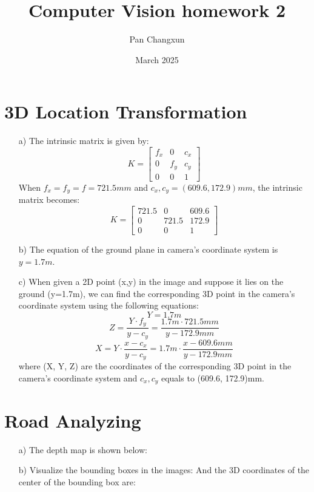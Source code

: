 \documentclass[]{article}
\title{Computer Vision homework 2}
\author{Pan Changxun}
\date{March 2025}
\begin{document}
\maketitle

\section{3D Location Transformation}
\begin{enumerate}
	\item[a)] The intrinsic matrix is given by:
	\begin{equation}
		K = \begin{bmatrix}
			f_x & 0 & c_x \\
			0 & f_y & c_y \\
			0 & 0 & 1
		\end{bmatrix}
	\end{equation}
	When \(f_x = f_y = f = 721.5mm\) and \(c_x, c_y = (609.6, 172.9)mm\), the intrinsic matrix becomes:
	\begin{equation}
		K = \begin{bmatrix}
			721.5 & 0 & 609.6 \\
			0 & 721.5 & 172.9 \\
			0 & 0 & 1
		\end{bmatrix}
	\end{equation}
	\item[b)] The equation of the ground plane in camera's coordinate system is \(y=1.7m\).
	\item[c)] When given a 2D point (x,y) in the image and suppose it lies on the ground (y=1.7m), we can find the corresponding 3D point in the camera's coordinate system using the following equations:
	\begin{equation}
		Y = 1.7m
	\end{equation}
	\begin{equation}
		Z = \frac{Y \cdot f_y}{y - c_y} = \frac{1.7m \cdot 721.5mm}{y - 172.9mm}
	\end{equation}
	\begin{equation}
		X = Y \cdot \frac{x - c_x}{y - c_y} = 1.7m \cdot \frac{x - 609.6mm}{y - 172.9mm}
	\end{equation}
	where (X, Y, Z) are the coordinates of the corresponding 3D point in the camera's coordinate system and \(c_x, c_y\) equals to (609.6, 172.9)mm.
\end{enumerate}

\section{Road Analyzing}
\begin{enumerate}
	\item[a)] The depth map is shown below:
	\item[b)] Visualize the bounding boxes in the images:
	And the 3D coordinates of the center of the bounding box are:
\end{enumerate}
\end{document}

